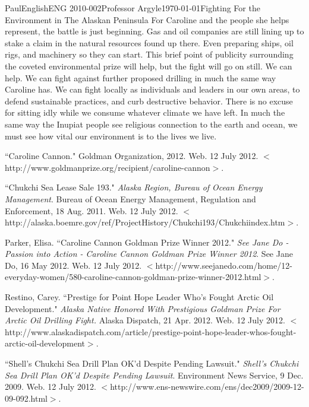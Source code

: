 \documentclass[12pt,letterpaper]{article}
\begin{document}
\begin{mla}{Paul}{English}{ENG 2010-002}{Professor Argyle}{\today}{Fighting For the Environment in The Alaskan Peninsula}
For Caroline and the people she helps represent, the battle is just beginning. Gas and oil companies are still lining up to stake a claim in the natural resources found up there. Even preparing ships, oil rigs, and machinery so they can start. This brief point of publicity surrounding the coveted environmental prize will help, but the fight will go on still. We can help. We can fight against further proposed drilling in much the same way Caroline has. We can fight locally as individuals and leaders in our own areas, to defend sustainable practices, and curb destructive behavior. There is no excuse for sitting idly while we consume whatever climate we have left. In much the same way the Inupiat people see religious connection to the earth and ocean, we must see how vital our environment is to the lives we live.

\begin{workscited}

\bibent
``Caroline Cannon." Goldman Organization, 2012. Web. 12 July 2012. $<$http://www.goldmanprize.org/recipient/caroline-cannon$>$.

\bibent
``Chukchi Sea Lease Sale 193." \textit{Alaska Region, Bureau of Ocean Energy Management}. Bureau of Ocean Energy Management, Regulation and Enforcement, 18 Aug. 2011. Web. 12 July 2012. $<$http://alaska.boemre.gov/ref/ProjectHistory/Chukchi193/Chukchiindex.htm$>$.


\bibent
Parker, Elisa. ``Caroline Cannon Goldman Prize Winner 2012." \textit{See Jane Do - Passion into Action - Caroline Cannon Goldman Prize Winner 2012}. See Jane Do, 16 May 2012. Web. 12 July 2012. $<$http://www.seejanedo.com/home/12-everyday-women/580-caroline-cannon-goldman-prize-winner-2012.html$>$.

\bibent 
Restino, Carey. ``Prestige for Point Hope Leader Who's Fought Arctic Oil Development." \textit{Alaska Native Honored With Prestigious Goldman Prize For Arctic Oil Drilling Fight.} Alaska Dispatch, 21 Apr. 2012. Web. 12 July 2012. $<$http://www.alaskadispatch.com/article/prestige-point-hope-leader-whos-fought-arctic-oil-development$>$.

\bibent
``Shell's Chukchi Sea Drill Plan OK'd Despite Pending Lawsuit." \textit{Shell's Chukchi Sea Drill Plan OK'd Despite Pending Lawsuit}. Environment News Service, 9 Dec. 2009. Web. 12 July 2012. $<$http://www.ens-newswire.com/ens/dec2009/2009-12-09-092.html$>$.


\end{workscited}
\end{mla}
\end{document}

